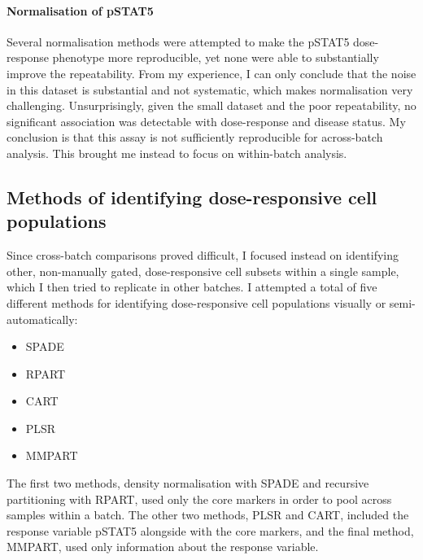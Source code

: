 

\paragraph{Normalisation of pSTAT5}

Several normalisation methods were attempted to make the pSTAT5 dose-response phenotype more reproducible,
yet none were able to substantially improve the repeatability.
From my experience, I can only conclude that the noise in this dataset is substantial and not systematic, which makes normalisation very challenging.
Unsurprisingly, given the small dataset and the poor repeatability, no significant association was detectable with dose-response and disease status.
My conclusion is that this assay is not sufficiently reproducible for across-batch analysis.
This brought me instead to focus on within-batch analysis.


\subsection{ Methods of identifying dose-responsive cell populations }


Since cross-batch comparisons proved difficult, I focused instead on identifying other, non-manually gated, dose-responsive cell subsets within a single sample, which I then tried to replicate in other batches.
I attempted a total of five different methods for identifying dose-responsive cell populations visually or semi-automatically:
\begin{itemize}
    \item SPADE
    \item RPART
    \item CART
    \item PLSR
    \item MMPART
\end{itemize}
The first two methods, density normalisation with SPADE and recursive partitioning with RPART, used only the core markers in order to pool across samples within a batch.
The other two methods, PLSR and CART, included the response variable pSTAT5 alongside with the core markers, and the final method, MMPART, used only information about the response variable.

